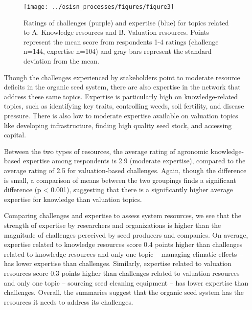 \documentclass[twoside,12pt,final]{ucthesis-CA2012}
\begin{document}
\begin{ucmainmatter}
\begin{figure}
{\centering \texttt{[image: ../osisn\_processes/figures/figure3]} 

}

\caption{Ratings of challenges (purple) and expertise (blue) for topics related to A. Knowledge resources and B. Valuation resources. Points represent the mean score from respondents 1-4 ratings (challenge n=144, expertise n=104) and gray bars represent the standard deviation from the mean.}\label{fig:unnamed-chunk-18}
\end{figure}
Though the challenges experienced by stakeholders point to moderate
resource deficits in the organic seed system, there are also expertise
in the network that address these same topics. Expertise is particularly
high on knowledge-related topics, such as identifying key traits,
controlling weeds, soil fertility, and disease pressure. There is also
low to moderate expertise available on valuation topics like developing
infrastructure, finding high quality seed stock, and accessing capital.

Between the two types of resources, the average rating of agronomic
knowledge-based expertise among respondents is 2.9 (moderate expertise),
compared to the average rating of 2.5 for valuation-based challenges.
Again, though the difference is small, a comparison of means between the
two groupings finds a significant difference (p \textless{} 0.001), suggesting
that there is a significantly higher average expertise for knowledge
than valuation topics.

Comparing challenges and expertise to assess system resources, we see
that the strength of expertise by researchers and organizations is
higher than the magnitude of challenges perceived by seed producers and
companies. On average, expertise related to knowledge resources score
0.4 points higher than challenges related to knowledge resources and
only one topic -- managing climatic effects -- has lower expertise than
challenges. Similarly, expertise related to valuation resources score
0.3 points higher than challenges related to valuation resources and
only one topic -- sourcing seed cleaning equipment -- has lower
expertise than challenges. Overall, the summaries suggest that the
organic seed system has the resources it needs to address its
challenges.


\end{ucmainmatter}
\end{document}
